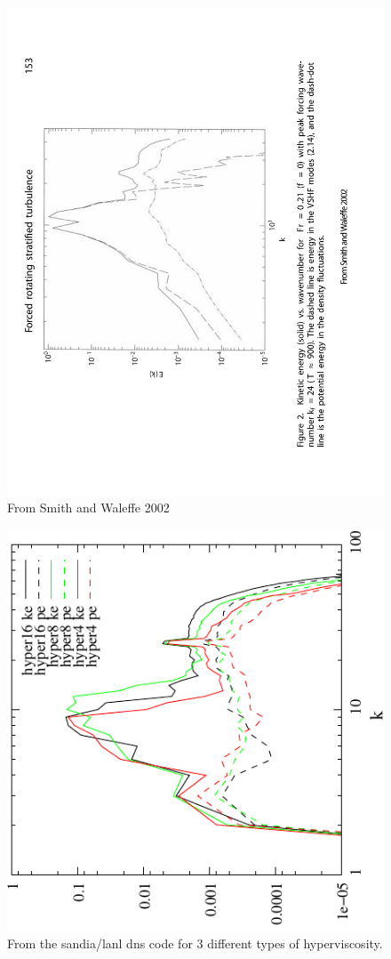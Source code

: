 \documentclass[12pt]{article}
\begin{document}
\begin{figure}
\begin{center}
\includegraphics[angle=-90,width=6.in]{SW02Fig2}
\caption{From Smith and Waleffe 2002}
\label{fig:SW02Fig2}
\end{center}
\end{figure}
\begin{figure}
\begin{center}
\includegraphics[angle=-90,width=4.in]{t900}
\caption{From the sandia/lanl dns code for 3 different types of hyperviscosity.}
\label{fig:t900}
\end{center}
\end{figure}
\end{document}
